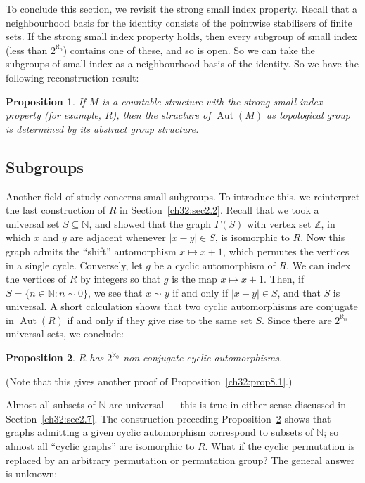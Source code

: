 \documentclass{book}
\newtheorem{proposition}{Proposition}
\DeclareMathOperator{\Aut}{Aut}
\begin{document}
To conclude this section, we revisit the strong small index property. Recall
that a neighbourhood basis for the identity consists of the pointwise 
stabilisers of finite sets. If the strong small index property holds, then
every subgroup of small index (less than $2^{\aleph_0}$) contains one of
these, and so is open. So we can take the subgroups of small index as a
neighbourhood basis of the identity. So we have the following reconstruction
result:

\begin{proposition}
\label{ch32:reconst}
If $M$ is a countable structure with the strong small index property (for
example, $R$), then the structure of $\Aut(M)$ as topological group is
determined by its abstract group structure.
\end{proposition}

\subsection{Subgroups}

Another field of study concerns small subgroups. To introduce this,
we reinterpret the last construction of $R$ in
Section~\ref{ch32:sec2.2}. Recall that we took a universal set $S
\subseteq \mathbb{N}$, and showed that the graph $\Gamma(S)$ with
vertex set $\mathbb{Z}$, in which $x$ and $y$ are adjacent whenever
$|x- y|\in S$, is isomorphic to $R$. Now this graph admits the
``shift'' automorphism $x \mapsto  x + 1$, which permutes the
vertices in a single cycle. Conversely, let $g$ be a cyclic
automorphism of $R$. We can index the vertices of $R$ by integers so
that $g$ is the map $x \mapsto  x + 1$. Then, if $S = \{n \in
\mathbb{N}: n \sim 0\}$, we see that $x \sim y$ if and only if $|x-
y|\in S$, and that $S$ is universal. A short calculation shows that
two cyclic automorphisms are conjugate in $\Aut(R)$ if and only
if they give rise to the same set $S$. Since there are
$2^{\aleph_0}$ universal sets, we conclude:

\begin{proposition}\label{ch32:prop8.2} 
$R$ has $2^{\aleph_0}$ non-conjugate cyclic automorphisms.
\end{proposition}

(Note that this gives another proof of Proposition~\ref{ch32:prop8.1}.)

Almost all subsets of $\mathbb{N}$ are universal --- this is true in
either sense discussed in Section~\ref{ch32:sec2.7}. The
construction preceding Proposition~\ref{ch32:prop8.2} shows that
graphs admitting a given cyclic automorphism correspond to subsets
of $\mathbb{N}$; so almost all ``cyclic graphs'' are isomorphic to
$R$. What if the cyclic permutation is replaced by an arbitrary
permutation or permutation group? The general answer is unknown:
\end{document}
